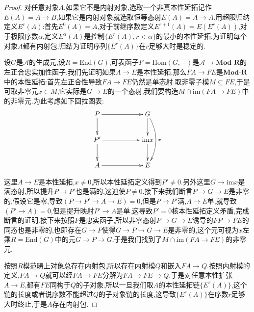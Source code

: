 \begin{enumerate}
\begin{proof}
    	对任意对象$A$,如果它不是内射对象,选取一个非真本性延拓记作$E(A)=A\to B$,如果它是内射对象就选取恒等态射$E(A)=A\to A$.用超限归纳定义$E^r(A)$:首先$E^0(A)=A$,对于前继序数定义$E^{r+1}(A)=E(E^r(A))$,对于极限序数$\alpha$,定义$E^{\alpha}(A)$是控制$\{E^r(A),r<\alpha\}$的最小的本性延拓.为证明每个对象$A$都有内射包,归结为证明序列$\{E^r(A)\}$在$r$足够大时是稳定的.
    	
    	\qquad
    	
    	设$G$是$\mathscr{A}$的生成元,设$R=\mathrm{End}(G)$,可表函子$F=\mathrm{Hom}(G,-)$是$\mathscr{A}\to\textbf{Mod-R}$的左正合忠实加性函子.我们先证明如果$A\to E$是本性延拓,那么$FA\to FE$是$\textbf{Mod-R}$中的本性延拓:首先左正合性导致$FA\to FE$仍然是单态射.取非零子模$M\subseteq FE$,于是可取非零元$x\in M$,它实际是$G\to E$的一个态射,我们要构造$M\cap\mathrm{im}(FA\to FE)$中的非零元.为此考虑如下回拉图表:
    	$$\xymatrix{P\ar[rr]\ar[d]&&G\ar@/^1pc/[dd]^x\ar[d]\\P'\ar[d]\ar[rr]&&\mathrm{im}x\ar[d]\\A\ar[rr]&&E}$$
    	
    	这里$A\to E$是本性延拓,$x\not=0$,所以本性延拓定义得到$P'\not=0$.另外这里$G\to\mathrm{im}x$是满态射,所以提升$P\to P'$也是满的,这迫使$P\not=0$.接下来我们断言$P\to G\to E$是非零的,假设它是零,导致$\left(P\to P'\to A\to E\right)=0$,但是$P\to P'$满,$A\to E$单,就导致$\left(P'\to A\right)=0$,但是提升映射$P'\to A$是单,这导致$P'=0$核本性延拓定义矛盾,完成断言的证明.接下来按照$F$是忠实函子,所以非零态射$P\to G\to E$诱导的$FP\to FE$的同态也是非零的,也即存在$G\to P$使得$G\to P\to G\to E$是非零的,这个元可视为$x$左乘$R=\mathrm{End}(G)$中的元$G\to P\to G$,于是我们找到了$M\cap\mathrm{im}(FA\to FE)$的非零元.
    	
    	\qquad
    	
    	按照$R$模范畴上对象总存在内射包,所以存在内射模$Q$和嵌入$FA\to Q$.按照内射模的定义,$FA\to Q$就可以经$FA\to FE$分解为$FA\to FE\to Q$.于是对任意本性扩张$A\to E$,都有$FE$同构于$Q$的子对象.所以一旦我们取$A$的本性延拓链$\{E^r(A)\}$,这个链的长度或者说序数不能超过$Q$的子对象链的长度,这导致$\{E^r(A)\}$在序数$r$足够大时终止,于是$A$存在内射包.
    \end{proof}
\end{enumerate}

